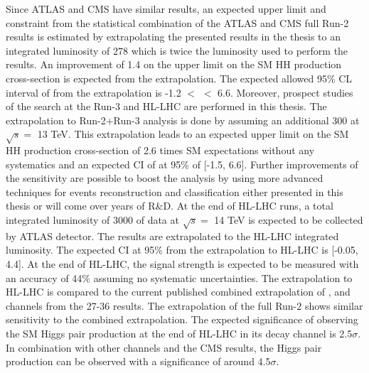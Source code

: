 Since ATLAS and CMS have similar results, an expected upper limit and \kl constraint from the statistical combination of the ATLAS and CMS full Run-2 \HHyybb results is estimated by extrapolating the presented results in the thesis to an integrated luminosity of 278 \ifb which is twice the luminosity used to perform the results. An improvement of 1.4 on the upper limit on the SM HH production cross-section is expected from the extrapolation. The expected allowed 95\% CL interval of \kl from the extrapolation is -1.2 $<$ \kl $<$ 6.6. Moreover, prospect studies of the \HHyybb search at the Run-3 and HL-LHC are performed in this thesis. The extrapolation to Run-2+Run-3 analysis is done by assuming an additional 300 \ifb at $\sqrt{s} = $ 13 TeV. This extrapolation leads to an expected upper limit on the SM HH production cross-section of 2.6 times SM expectations without any systematics and an expected CI of \kl at 95\% of [-1.5, 6.6]. Further improvements of the sensitivity are possible to boost the \HHyybb analysis by using more advanced techniques for events reconstruction and classification either presented in this thesis or will come over years of R\&D. At the end of HL-LHC runs, a total integrated luminosity of 3000 \ifb of data at $\sqrt{s} = $ 14 TeV is expected to be collected by ATLAS detector. The \HHyybb results are extrapolated to the HL-LHC integrated luminosity. The expected \kl CI at 95\% from the extrapolation to HL-LHC is [-0.05, 4.4]. At the end of HL-LHC, the signal strength is expected to be measured with an accuracy of 44\% assuming no systematic uncertainties. The extrapolation to HL-LHC is compared to the current published combined extrapolation of \bbbb, \bbtt and \bbyy channels from the 27-36 \ifb results. The extrapolation of the full Run-2 \HHyybb shows similar sensitivity to the combined extrapolation. The expected significance of observing the SM Higgs pair production at the end of HL-LHC in its \bbyy decay channel is 2.5$\sigma$. In combination with other channels and the CMS results, the Higgs pair production can be observed with a significance of around 4.5$\sigma$. 
